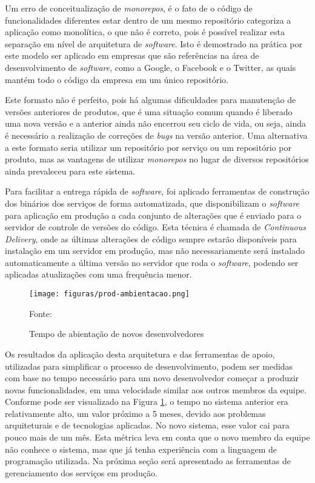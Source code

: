 Um erro de conceitualização de \emph{monorepos}, é o fato de o código de
funcionalidades diferentes estar dentro de um mesmo repositório categoriza
a aplicação como monolítica, o que não é correto, pois é possível
realizar esta separação em nível de arquitetura de \emph{software}. Isto é
demostrado na prática por este modelo ser aplicado em empresas que são
referências na área de desenvolvimento de \emph{software}, como a Google,
o Facebook e o Twitter, as quais mantém todo o código da empresa em um
único repositório.

Este formato não é perfeito, pois há algumas dificuldades para manutenção
de versões anteriores de produtos, que é uma situação comum quando é
liberado uma nova versão e a anterior ainda não encerrou seu ciclo de vida,
ou seja, ainda é necessário a realização de correções de \emph{bugs}
na versão anterior. Uma alternativa a este formato seria utilizar um
repositório por serviço ou um repositório por produto, mas as vantagens
de utilizar \emph{monorepos} no lugar de diversos repositórios ainda
prevaleceu para este sistema.

Para facilitar a entrega rápida de \emph{software}, foi aplicado ferramentas de
construção dos binários dos serviços de forma automatizada, que disponibilizam
o \emph{software} para aplicação em produção a cada conjunto de alterações que é
enviado para o servidor de controle de versões do código. Esta técnica é
chamada de \emph{Continuous Delivery}, onde as últimas alterações de código
sempre estarão disponíveis para instalação em um servidor em produção, mas
não necessariamente será instalado automaticamente a última versão no
servidor que roda o \emph{software}, podendo ser aplicadas atualizações com uma
frequência menor.

\begin{figure}[H]
	\centering
	\caption{Tempo de abientação de novos desenvolvedores}
	\texttt{[image: figuras/prod-ambientacao.png]}

	\label{fig:prod-ambientacao}
	\footnotesize Fonte: \fonteOAutor
\end{figure}

Os resultados da aplicação desta arquitetura e das ferramentas de apoio,
utilizadas para simplificar o processo de desenvolvimento, podem ser
medidas com base no tempo necessário para um novo desenvolvedor começar
a produzir novas funcionalidades, em uma velocidade similar aos outros
membros da equipe. Conforme pode ser visualizado na Figura
\ref{fig:prod-ambientacao}, o tempo no sistema anterior era relativamente
alto, um valor próximo a 5 meses, devido aos problemas arquiteturais e de
tecnologias aplicadas. No novo sistema, esse valor cai para pouco mais
de um mês. Esta métrica leva em conta que o novo membro da equipe não
conhece o sistema, mas que já tenha experiência com a linguagem de
programação utilizada. Na próxima seção será apresentado as ferramentas
de gerenciamento dos serviços em produção.

